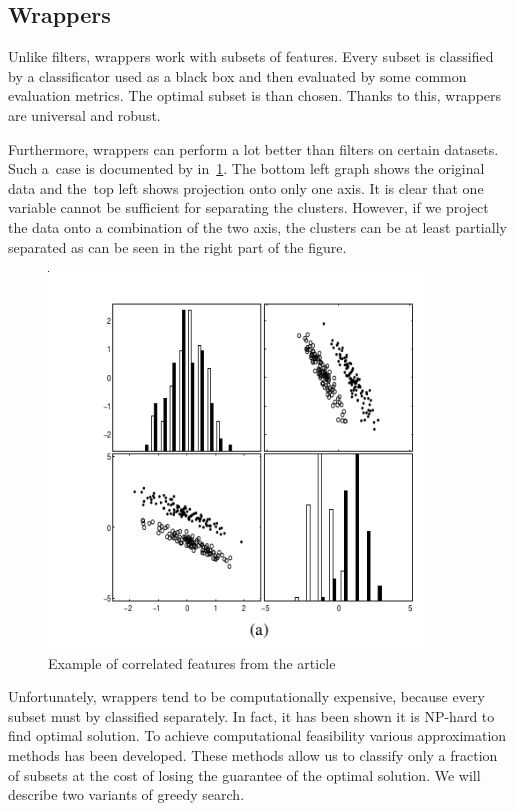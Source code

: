 \subsection{Wrappers}

Unlike filters, wrappers work with subsets of features. Every subset is classified by a classificator used as a black box and then evaluated by some common evaluation metrics. The optimal subset is than chosen. Thanks to this, wrappers are universal and robust.

Furthermore, wrappers can perform a lot better than filters on certain datasets. Such a~case is documented by \citet{GuyEli03} in~\ref{guyeli03-figure3}. The bottom left graph shows the original data and the~top left shows projection onto only one axis. It is clear that one variable cannot be sufficient for separating the clusters. However, if we project the data onto a combination of the two axis, the clusters can be at least partially separated as can be seen in the right part of the figure.
 

\begin{figure}[ht]\centering
\includegraphics[width=100mm]{../img/guyeli_figure3.png}
\caption{Example of correlated features from the article}
\label{guyeli03-figure3}
\end{figure}

Unfortunately, wrappers tend to be computationally expensive, because every subset must by classified separately. In fact, it has been shown it is NP-hard to find optimal solution. To achieve computational feasibility various approximation methods has been developed. These methods allow us to classify only a fraction of subsets at the cost of losing the guarantee of the optimal solution. We will describe two variants of greedy search.

